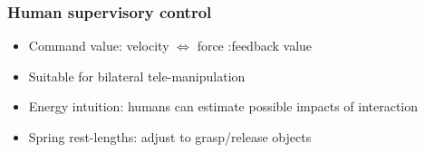 \documentclass[student]{ITRslides}
\begin{document}
%			
%	
%
%		
%		
%			

\begin{frame}
	\frametitle{Human supervisory control}
	\begin{itemize}
			\item Command value: velocity $\Leftrightarrow$ force :feedback value
			\item Suitable for bilateral tele-manipulation
			\item Energy intuition: humans can estimate possible impacts of interaction
			\item Spring rest-lengths: adjust to grasp/release objects
		\end{itemize}
\end{frame}
\end{document}
